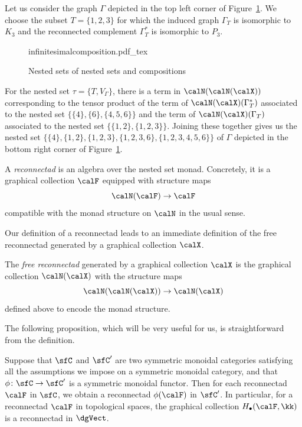 \begin{exam}
Let us consider the graph $\Gamma$ depicted in the top left corner of Figure~\ref{fig:nested set composition}. We choose the subset $T=\{1,2,3\}$ for which the induced graph $\Gamma_T$ is isomorphic to $K_3$ and the reconnected complement $\Gamma^*_T$ is isomorphic to $P_3$. 
\begin{figure}[ht]
    \centering
    \def\svgwidth{\columnwidth}
    {infinitesimalcomposition.pdf_tex}
    \caption{Nested sets of nested sets and compositions}
    \label{fig:nested set composition}
\end{figure}
For the nested set $\tau=\{T,V_\Gamma\}$, there is a term in $\calN(\calN(\calX))$ corresponding to the tensor product of the term of $\calN(\calX)(\Gamma^*_T)$ associated to the nested set $\{\{4\},\{6\},\{4,5,6\}\}$ and the term of $\calN(\calX)(\Gamma_T)$ associated to the nested set $\{\{1,2\},\{1,2,3\}\}$. Joining these together gives us the nested set $\{\{4\},\{1,2\},\{1,2,3\},\{1,2,3,6\},\{1,2,3,4,5,6\}\}$ of $\Gamma$ depicted in the bottom right corner of Figure~\ref{fig:nested set composition}. 
\end{exam}

\begin{defi}
A \emph{reconnectad} is an algebra over the nested set monad. Concretely, it is a graphical collection $\calF$ equipped with structure maps
 \[
\calN(\calF)\to\calF
 \]
compatible with the monad structure on $\calN$ in the usual sense. 
\end{defi}

Our definition of a reconnectad leads to an immediate definition of the free reconnectad generated by a graphical collection $\calX$. 

\begin{defi}
The \emph{free reconnectad} generated by a graphical collection $\calX$ is the graphical collection $\calN(\calX)$ with the structure maps
 \[
\calN(\calN(\calX))\to\calN(\calX)
 \]
defined above to encode the monad structure.
\end{defi}

The following proposition, which will be very useful for us, is straightforward from the definition.

\begin{prop}\label{prop:grEnd-monoidal}
Suppose that $\sfC$ and $\sfC'$ are two symmetric monoidal categories satisfying all the assumptions we impose on a symmetric monoidal category, and that $\phi\colon \sfC\to \sfC'$ is a symmetric monoidal functor. Then for each reconnectad $\calF$ in $\sfC$, we obtain a reconnectad $\phi(\calF)$ in $\sfC'$. In particular, for a reconnectad $\calF$ in topological spaces, the graphical collection $H_{\bullet}(\calF,\kk)$ is a reconnectad in $\dgVect$.
\end{prop}

